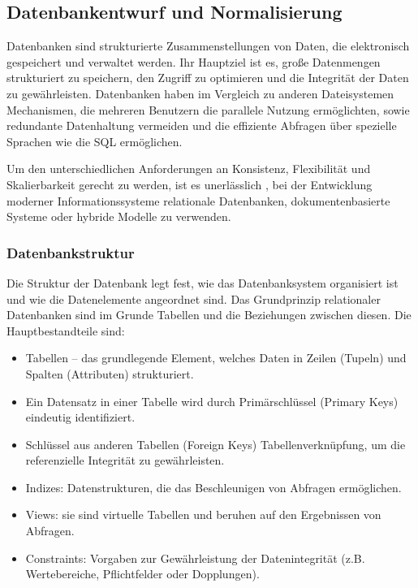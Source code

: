 \subsection{Datenbankentwurf und Normalisierung}
\label{subsec:datenbankentwurf-und-normalisierung}
Datenbanken sind strukturierte Zusammenstellungen von Daten, die elektronisch gespeichert und verwaltet werden.
Ihr Hauptziel ist es, große Datenmengen strukturiert zu speichern, den Zugriff zu optimieren und die Integrität der Daten zu gewährleisten.
Datenbanken haben im Vergleich zu anderen Dateisystemen Mechanismen, die mehreren Benutzern die parallele Nutzung ermöglichten,
sowie redundante Datenhaltung vermeiden und die effiziente Abfragen über spezielle Sprachen wie die \ac{SQL} ermöglichen.

Um den unterschiedlichen Anforderungen an Konsistenz, Flexibilität und Skalierbarkeit gerecht zu werden, ist es unerlässlich
, bei der Entwicklung moderner Informationssysteme relationale Datenbanken, dokumentenbasierte Systeme oder hybride Modelle zu verwenden.


\subsubsection{Datenbankstruktur}
Die Struktur der Datenbank legt fest, wie das Datenbanksystem organisiert ist und wie die Datenelemente angeordnet sind.
Das Grundprinzip relationaler Datenbanken sind im Grunde Tabellen und die Beziehungen zwischen diesen.
Die Hauptbestandteile sind:

\begin{itemize}
\item Tabellen – das grundlegende Element, welches Daten in Zeilen (Tupeln) und Spalten (Attributen) strukturiert.
\item Ein Datensatz in einer Tabelle wird durch Primärschlüssel (Primary Keys) eindeutig identifiziert.
\item Schlüssel aus anderen Tabellen (Foreign Keys)  Tabellenverknüpfung, um die referenzielle Integrität zu gewährleisten.
\item Indizes: Datenstrukturen, die das Beschleunigen von Abfragen ermöglichen.
\item Views: sie sind virtuelle Tabellen und beruhen auf den Ergebnissen von Abfragen.
\item Constraints: Vorgaben zur Gewährleistung der Datenintegrität (z.B. Wertebereiche, Pflichtfelder oder Dopplungen).
\end{itemize}
